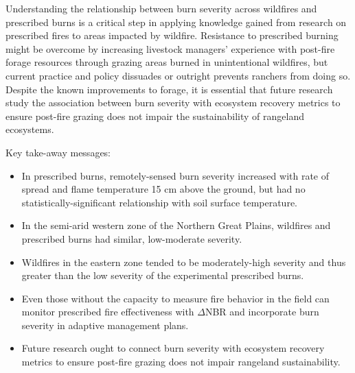 \documentclass[fire,article,submit,oneauthor,pdftex]{Definitions/mdpi}
\begin{document}
Understanding the relationship between burn severity across wildfires and prescribed burns is a critical step in applying knowledge gained from research on prescribed fires to areas impacted by wildfire. 
Resistance to prescribed burning might be overcome by increasing livestock managers' experience with post-fire forage resources through grazing areas burned in unintentional wildfires, but current practice and policy dissuades or outright prevents ranchers from doing so.
Despite the known improvements to forage, it is essential that future research study the association between burn severity with ecosystem recovery metrics to ensure post-fire grazing does not impair the sustainability of rangeland ecosystems. 

Key take-away messages: 

\begin{itemize}
	\item In prescribed burns, remotely-sensed burn severity increased with rate of spread and flame temperature 15 cm above the ground, but had no statistically-significant relationship with soil surface temperature.
	\item In the semi-arid western zone of the Northern Great Plains, wildfires and prescribed burns had similar, low-moderate severity. 
	\item Wildfires in the eastern zone tended to be moderately-high severity and thus greater than the low severity of the experimental prescribed burns. 
	\item Even those without the capacity to measure fire behavior in the field can monitor prescribed fire effectiveness with $\Delta$NBR and incorporate burn severity in adaptive management plans. 
	\item Future research ought to connect burn severity with ecosystem recovery metrics to ensure post-fire grazing does not impair rangeland sustainability.
	
\end{itemize}
	


\vspace{6pt}

\end{document}
